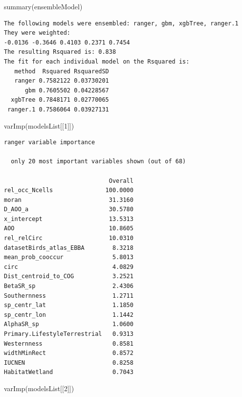 \documentclass[
  letterpaper,
  DIV=11,
  numbers=noendperiod]{scrartcl}
\newenvironment{Shaded}{\begin{snugshade}}{\end{snugshade}}
\newcommand{\DecValTok}[1]{\textcolor[rgb]{0.68,0.00,0.00}{#1}}
\newcommand{\FunctionTok}[1]{\textcolor[rgb]{0.28,0.35,0.67}{#1}}
\newcommand{\NormalTok}[1]{\textcolor[rgb]{0.00,0.23,0.31}{#1}}
\begin{document}
\begin{Shaded}
\begin{Highlighting}[]
\FunctionTok{summary}\NormalTok{(ensembleModel)}
\end{Highlighting}
\end{Shaded}

\begin{verbatim}
The following models were ensembled: ranger, gbm, xgbTree, ranger.1 
They were weighted: 
-0.0136 -0.3646 0.4103 0.2371 0.7454
The resulting Rsquared is: 0.838
The fit for each individual model on the Rsquared is: 
   method  Rsquared RsquaredSD
   ranger 0.7582122 0.03730201
      gbm 0.7605502 0.04228567
  xgbTree 0.7848171 0.02770065
 ranger.1 0.7586064 0.03927131
\end{verbatim}

\begin{Shaded}
\begin{Highlighting}[]
\FunctionTok{varImp}\NormalTok{(modelsList[[}\DecValTok{1}\NormalTok{]])}
\end{Highlighting}
\end{Shaded}

\begin{verbatim}
ranger variable importance

  only 20 most important variables shown (out of 68)

                              Overall
rel_occ_Ncells               100.0000
moran                         31.3160
D_AOO_a                       30.5780
x_intercept                   13.5313
AOO                           10.8605
rel_relCirc                   10.0310
datasetBirds_atlas_EBBA        8.3218
mean_prob_cooccur              5.8013
circ                           4.0829
Dist_centroid_to_COG           3.2521
BetaSR_sp                      2.4306
Southernness                   1.2711
sp_centr_lat                   1.1850
sp_centr_lon                   1.1442
AlphaSR_sp                     1.0600
Primary.LifestyleTerrestrial   0.9313
Westernness                    0.8581
widthMinRect                   0.8572
IUCNEN                         0.8258
HabitatWetland                 0.7043
\end{verbatim}

\begin{Shaded}
\begin{Highlighting}[]
\FunctionTok{varImp}\NormalTok{(modelsList[[}\DecValTok{2}\NormalTok{]])}
\end{Highlighting}
\end{Shaded}
\end{document}
